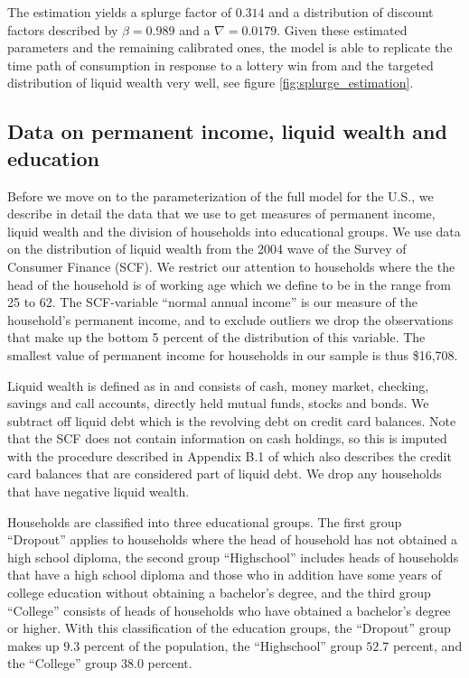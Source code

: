\documentclass[../HAFiscal]{subfiles}
\begin{document}
The estimation yields a splurge factor of $0.314$ and a distribution of discount factors described by $\beta = 0.989$ and a $\nabla=0.0179$. Given these estimated parameters and the remaining calibrated ones, the model is able to replicate the time path of consumption in response to a lottery win from \citet{fagereng_mpc_2021} and the targeted distribution of liquid wealth very well, see figure \ref{fig:splurge_estimation}.


\subsection{Data on permanent income, liquid wealth and education}
\label{sec:SCFdata}

Before we move on to the parameterization of the full model for the U.S., we describe in detail the data that we use to get measures of permanent income, liquid wealth and the division of households into educational groups. We use data on the distribution of liquid wealth from the 2004 wave of the Survey of Consumer Finance (SCF). We restrict our attention to households where the the head of the household is of working age which we define to be in the range from 25 to 62. The SCF-variable ``normal annual income'' is our measure of the household's permanent income, and to exclude outliers we drop the observations that make up the bottom 5 percent of the distribution of this variable. The smallest value of permanent income for households in our sample is thus \$16,708. 

Liquid wealth is defined as in \cite{kaplan2014model} and consists of cash, money market, checking, savings and call accounts, directly held mutual funds, stocks and bonds. We subtract off liquid debt which is the revolving debt on credit card balances. Note that the SCF does not contain information on cash holdings, so this is imputed with the procedure described in Appendix B.1 of \cite{kaplan2014model} which also describes the credit card balances that are considered part of liquid debt. We drop any households that have negative liquid wealth. 

Households are classified into three educational groups. The first group ``Dropout'' applies to households where the head of household has not obtained a high school diploma, the second group ``Highschool'' includes heads of households that have a high school diploma and those who in addition have some years of college education without obtaining a bachelor's degree, and the third group ``College'' consists of heads of households who have obtained a bachelor's degree or higher. With this classification of the education groups, the ``Dropout'' group makes up $9.3$ percent of the population, the ``Highschool'' group $52.7$ percent, and the ``College'' group $38.0$ percent. 
\end{document}
